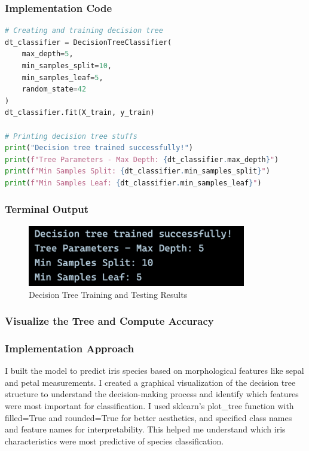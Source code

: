 \documentclass[12pt,a4paper]{article}
\begin{document}
\subsubsection{Implementation Code}
\begin{lstlisting}[language=Python, caption=Train/Test a Decision Tree on a Labelled Dataset]
# Creating and training decision tree 
dt_classifier = DecisionTreeClassifier(
    max_depth=5,
    min_samples_split=10,
    min_samples_leaf=5,
    random_state=42
)
dt_classifier.fit(X_train, y_train)

# Printing decision tree stuffs
print("Decision tree trained successfully!")
print(f"Tree Parameters - Max Depth: {dt_classifier.max_depth}")
print(f"Min Samples Split: {dt_classifier.min_samples_split}")
print(f"Min Samples Leaf: {dt_classifier.min_samples_leaf}")
\end{lstlisting}

\subsubsection{Terminal Output}

\begin{figure}[h!]
    \centering
    \includegraphics[width=0.85\textwidth]{Figures/training.png}
    \caption{Decision Tree Training and Testing Results}
\end{figure}

\newpage
\subsubsection{Visualize the Tree and Compute Accuracy}

\subsubsection{Implementation Approach}
I built the model to predict iris species based on morphological features like sepal and petal measurements. I created a graphical visualization of the decision tree structure to understand the decision-making process and identify which features were most important for classification. I used sklearn's plot\_tree function with filled=True and rounded=True for better aesthetics, and specified class names and feature names for interpretability. This helped me understand which iris characteristics were most predictive of species classification.
\end{document}
